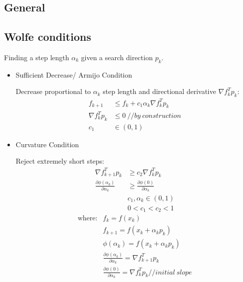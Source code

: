 \documentclass[8pt,letter]{article}
\begin{document}

\begin{multicols*}{2}

  \section{General}

  \subsection{Wolfe conditions}

  Finding a step length $\alpha_k$ given a search direction $p_k$.
  
  \begin{itemize}
    
  \item Sufficient Decrease/ Armijo Condition
    
  Decrease proportional to $\alpha_k$ step length and directional derivative $\nabla f_k^T p_k$:
  \begin{align}
    f_{k+1} & \leq f_k + c_1 \alpha_k \nabla f_k^T p_k\\
    \nabla f_k^T p_k & \leq 0\ //by\ construction\\
    c_1 & \in (0,1)
  \end{align}
  
  \item Curvature Condition
  
  Reject extremely short steps:
  \begin{align}
    \nabla f_{k+1}^T p_k & \geq c_2 \nabla f_k^T p_k\\
    \frac{\partial \phi(\alpha_k)}{\partial \alpha_k} & \geq \frac{\partial \phi(0)}{\partial \alpha_k}\\
              &c_1,\alpha_k \in (0,1)\\
    &0<c_1<c_2<1
  \end{align}
  \begin{align*}
  \text{where}:& f_{k} = f(x_k)\\
  & f_{k+1} = f(x_k+\alpha_k p_k)\\
  & \phi(\alpha_k) = f(x_k + \alpha_k p_k)\\
  & \frac{\partial \phi(\alpha_k)}{\partial \alpha_k} = \nabla f_{k+1}^T p_k\\
  & \frac{\partial \phi(0)}{\partial \alpha_k} = \nabla f_{k}^T p_k //initial\ slope
  \end{align*}


\end{itemize}
\end{multicols*}
\end{document}

